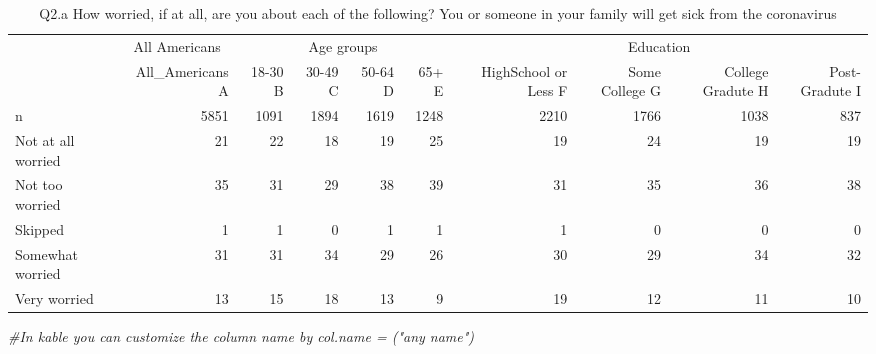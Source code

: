 \documentclass[
]{article}
\newenvironment{Shaded}{\begin{snugshade}}{\end{snugshade}}
\newcommand{\CommentTok}[1]{\textcolor[rgb]{0.56,0.35,0.01}{\textit{#1}}}
\begin{document}
\begin{table}

\caption{\label{tab:unnamed-chunk-7}Q2.a How worried, if at all, are you about each of the following? You or someone in your family will get sick from the coronavirus}
\fontsize{12}{14}\selectfont
\begin{tabular}[t]{l|r|r|r|r|r|r|r|r|r}
\hline
\multicolumn{1}{c|}{ } & \multicolumn{1}{c|}{All Americans} & \multicolumn{4}{c|}{Age groups} & \multicolumn{4}{c}{Education} \\
\cline{2-2} \cline{3-6} \cline{7-10}
  & All\_Americans
A & 18-30
B & 30-49
C & 50-64
D & 65+
E & HighSchool or Less
F & Some College
G & College  Gradute
H & Post-Gradute
I\\
\hline
n & 5851 & 1091 & 1894 & 1619 & 1248 & 2210 & 1766 & 1038 & 837\\
\hline
Not at all worried & 21 & 22 & 18 & 19 & 25 & 19 & 24 & 19 & 19\\
\hline
Not too worried & 35 & 31 & 29 & 38 & 39 & 31 & 35 & 36 & 38\\
\hline
Skipped & 1 & 1 & 0 & 1 & 1 & 1 & 0 & 0 & 0\\
\hline
Somewhat worried & 31 & 31 & 34 & 29 & 26 & 30 & 29 & 34 & 32\\
\hline
Very worried & 13 & 15 & 18 & 13 & 9 & 19 & 12 & 11 & 10\\
\hline
\end{tabular}
\end{table}

\begin{Shaded}
\begin{Highlighting}[]
\CommentTok{\#In kable you can customize the column name by col.name = ("any name")}
\end{Highlighting}
\end{Shaded}
\end{document}
